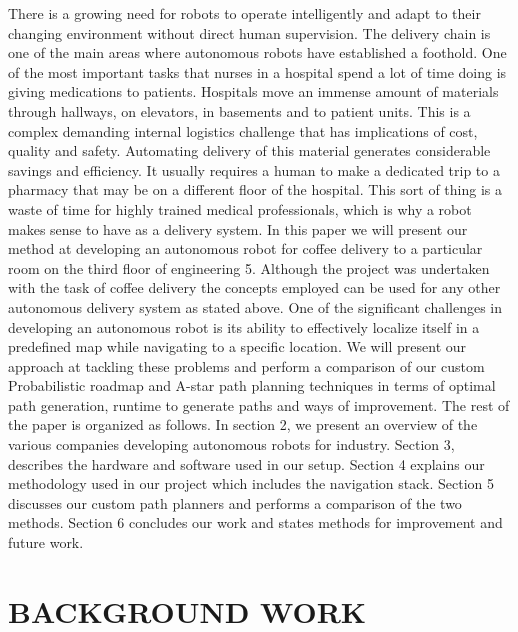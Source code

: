 \documentclass[letterpaper, 10 pt, conference]{ieeeconf}  %
\begin{document}
There is a growing need for robots to operate intelligently and adapt to their changing environment without direct human supervision. The delivery chain is one of the main areas where autonomous robots have established a foothold.
One of the most important tasks that nurses in a hospital spend a lot of time doing is giving medications to patients. Hospitals move an immense amount of materials through hallways, on elevators, in basements and to patient units. This is a complex demanding internal logistics challenge that has implications of cost, quality and safety. Automating delivery of this material generates considerable savings and efficiency. It usually requires a human to make a dedicated trip to a pharmacy that may be on a different floor of the hospital. This sort of thing is a waste of time for highly trained medical professionals, which is why a robot makes sense to have as a delivery system. 
In this paper we will present our method at developing an autonomous robot for coffee delivery to a particular room on the third floor of engineering 5. Although the project was undertaken with the task of coffee delivery the concepts employed can be used for any other autonomous delivery system as stated above. One of the significant challenges in developing an autonomous robot is its ability to effectively localize itself in a predefined map while navigating to a specific location. We will present our approach at tackling these problems and perform a comparison of our custom Probabilistic roadmap and A-star path planning techniques in terms of optimal path generation, runtime to generate paths and ways of improvement. 
The rest of the paper is organized as follows. In section 2, we present an overview of the various companies developing autonomous robots for industry. Section 3, describes the hardware and software used in our setup. Section 4 explains our methodology used in our project which includes the navigation stack. Section 5 discusses our custom path planners and performs a comparison of the two methods. Section 6 concludes our work and states methods for improvement and future work.

\section{BACKGROUND WORK}
\end{document}
